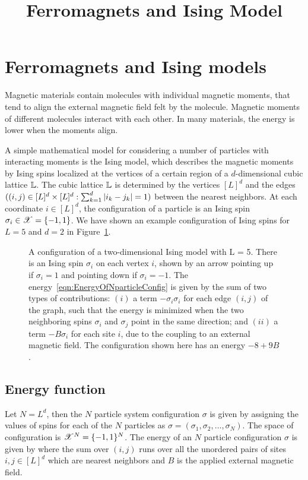 \documentclass[letterpaper,english,10pt]{article}
\title{Ferromagnets and Ising Model}
\begin{document}
\maketitle
\section{Ferromagnets and Ising models}
Magnetic materials contain molecules with individual magnetic moments, that tend to align the external magnetic field felt by the molecule. 
Magnetic moments of different molecules interact with each other. 
In many materials, the energy is lower when the moments align. 

A simple mathematical model for considering a number of particles with interacting moments is the Ising model, which describes the magnetic moments by Ising spins localized at the vertices of a certain region of a $d$-dimensional cubic lattice $\mathbb{L}$. 
The cubic lattice $\mathbb{L}$ is determined by the vertices $[L]^d$ and the edges $((i,j) \in [L]^d \times [L]^d: \sum_{k=1}^d\left\lvert i_k-j_k\right\rvert = 1)$ between the nearest neighbors.  
At each coordinate $i \in [L]^d$, the configuration of a particle is an Ising spin $\sigma_i \in \mathscr{X} = \{-1,1\}$. 
We have shown an example configuration of Ising spins for $L=5$ and $d=2$ in Figure~\ref{figure:IsingSpins}. 

\begin{figure}
\centering

\caption{A configuration of a two-dimensional Ising model with L = 5. There is an Ising spin $\sigma_i$ on each vertex $i$, shown by an arrow pointing up if $\sigma_i = 1$ and pointing down if $\sigma_i = -1$.
The energy~\eqref{eqn:EnergyOfNparticleConfig}  is given by the sum of two types of contributions: 
$(i)$ a term $-\sigma_i\sigma_i$ for each edge $(i, j)$ of the graph, such that the energy is minimized when the two neighboring spins $\sigma_i$ and $\sigma_j$ point in the same direction; 
and $(ii)$ a term $-B\sigma_i$ for each site $i$, due to the coupling to an external magnetic field. 
The configuration shown here has an energy $-8+9B$.}
\label{figure:IsingSpins}
\end{figure}

\subsection{Energy function}
Let $N = L^d$, then the $N$ particle system configuration $\sigma$ is given by assigning the values of spins  for each of the $N$ particles as $\sigma = (\sigma_1, \sigma_2, \dots, \sigma_N)$. 
The space of configuration is $\mathscr{X}^N = \{-1,1\}^N$. 
The energy of an $N$ particle configuration $\sigma$ is given by
where the sum over $(i,j)$ runs over all the unordered pairs of sites $i,j \in [L]^d$ which are nearest neighbors and $B$ is the applied external magnetic field. 
\end{document}
